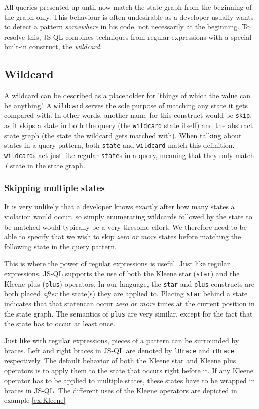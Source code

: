 All queries presented up until now match the state graph from the beginning of the graph only. This behaviour is often undesirable as a developer usually wants to detect a pattern \textit{somewhere} in his code, not necessarily at the beginning. To resolve this, JS-QL combines techniques from regular expressions with a special built-in construct, the \textit{wildcard}.


\subsection{Wildcard}

A wildcard can be described as a placeholder for 'things of which the value can be anything'. A \texttt{wildcard} serves the sole purpose of matching any state it gets compared with. In other words, another name for this construct would be \texttt{skip}, as it skips a state in both the query (the \texttt{wildcard} state itself) and the abstract state graph (the state the wildcard gets matched with). When talking about states in a query pattern, both \texttt{state} and \texttt{wildcard} match this definition. \texttt{wildcard}s act just like regular \texttt{state}s in a query, meaning that they only match \textit{1} state in the state graph. 

\subsubsection*{Skipping multiple states}

It is very unlikely that a developer knows exactly after how many states a violation would occur, so simply enumerating wildcards followed by the state to be matched would typically be a very tiresome effort. We therefore need to be able to specify that we wish to skip \textit{zero or more} states before matching the following state in the query pattern. 

This is where the power of regular expressions is useful. Just like regular expressions, JS-QL supports the use of both the Kleene star (\texttt{star}) and the Kleene plus (\texttt{plus}) operators. In our language, the \texttt{star} and \texttt{plus} constructs are both placed \textit{after} the state(s) they are applied to. Placing \texttt{star} behind a state indicates that that statencan occur \textit{zero or more} times at the current position in the state graph. The semantics of \texttt{plus} are very similar, except for the fact that the state has to occur at least once. 

Just like with regular expressions, pieces of a pattern can be surrounded by braces. Left and right braces in JS-QL are denoted by \texttt{lBrace} and \texttt{rBrace} respectively. The default behavior of both the Kleene star and Kleene plus operators is to apply them to the state that occurs right before it. If any Kleene operator has to be applied to multiple states, these states have to be wrapped in braces in JS-QL. The different uses of the Kleene operators are depicted in example \ref{ex:Kleene}

